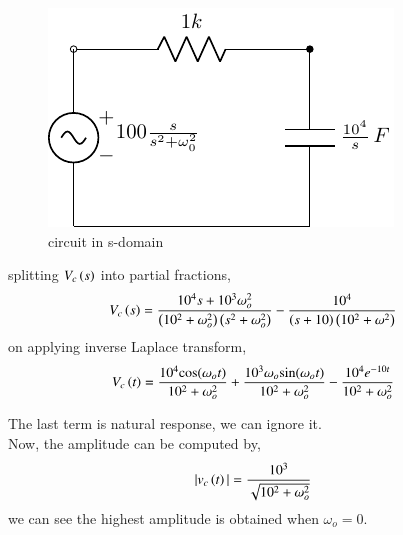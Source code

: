 \documentclass[journal,12pt,twocolumn]{IEEEtran}
\theoremstyle{remark}
\begin{document}
\begin{figure}[h!]
    \includegraphics[width = \columnwidth]{figs/c_fig2.pdf}
    \caption{circuit in s-domain }
    \centering
    \label{fig: bm_16_fig_2}
\end{figure}
splitting $ V_c\left(s\right)$ into partial fractions,
\begin{align}
V_c\left(s\right) &= \frac{10^4s+10^3\omega_o^2}{\left(10^2+\omega_o^2\right)\left(s^2+\omega_o^2\right)}-\frac{10^4}{\left(s+10\right)\left(10^2+\omega^2\right)}
\end{align}
on applying inverse Laplace transform,
\begin{align}
V_c\left(t\right)&= \frac{10^4\text{cos}(\omega_o t)}{10^2+\omega_o^2}+\frac{10^3\omega_o \text{sin}(\omega_o t)}{10^2+\omega_o^2}-\frac{10^4e^{-10t}}{10^2+\omega_o^2}
\end{align}

\vspace{5cm}
The last term is natural response, we can ignore it.\\
Now, the amplitude can be computed by,
\begin{align}
|v_c\left(t\right)| &= \frac{10^3}{\sqrt{10^2+\omega_o^2}}
\end{align}
we can see the highest amplitude is obtained when $ \omega_o = 0$.
\end{document}
